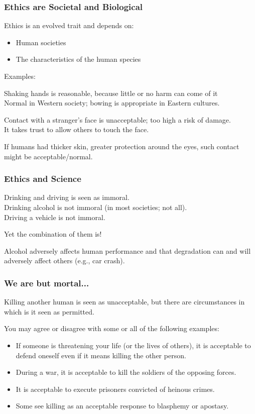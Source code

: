 \begin{frame}
\frametitle{Ethics are Societal and Biological}

Ethics is an evolved trait and depends on:
\begin{itemize}
\item Human societies
\item The characteristics of the human species
\end{itemize}

Examples:

Shaking hands is reasonable, because little or no harm can come of it\\
\quad Normal in Western society; bowing is appropriate in Eastern cultures.

Contact with a stranger's face is unacceptable; too high a risk of damage.\\
\quad It takes trust to allow others to touch the face.

If humans had thicker skin, greater protection around the eyes, such contact might be acceptable/normal.

\end{frame}



\begin{frame}
\frametitle{Ethics and Science}

Drinking and driving is seen as immoral.\\
\quad Drinking alcohol is not immoral (in most societies; not all).\\
\quad Driving a vehicle is not immoral. 

Yet the combination of them is! 


Alcohol adversely affects human performance and that degradation can and will adversely affect others (e.g., car crash).

\end{frame}



\begin{frame}
\frametitle{We are but mortal...}

Killing another human is seen as unacceptable, but there are circumstances in which is it seen as permitted.

You may agree or disagree with some or all of the following examples:

\begin{itemize}
	\item If someone is threatening your life (or the lives of others), it is acceptable to defend oneself even if it means killing the other person.
	\item During a war, it is acceptable to kill the soldiers of the opposing forces.
	\item It is acceptable to execute prisoners convicted of heinous crimes.
	\item Some see killing as an acceptable response to blasphemy or apostasy.
\end{itemize}

\end{frame}



